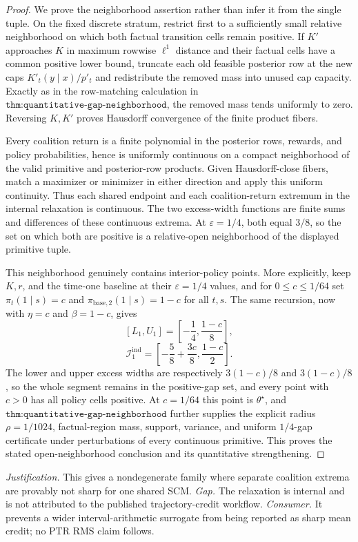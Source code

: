 \documentclass{article}
\begin{document}
\begin{proof}
We prove the neighborhood assertion rather than infer it from the single tuple.  On the fixed discrete stratum, restrict first to a sufficiently small relative neighborhood on which both factual transition cells remain positive.  If \(K'\) approaches \(K\) in maximum rowwise \(\ell^1\) distance and their factual cells have a common positive lower bound, truncate each old feasible posterior row at the new caps \(K'_t(y\mid x)/p'_t\) and redistribute the removed mass into unused cap capacity.  Exactly as in the row-matching calculation in \(\texttt{thm:quantitative-gap-neighborhood}\), the removed mass tends uniformly to zero.  Reversing \(K,K'\) proves Hausdorff convergence of the finite product fibers.

Every coalition return is a finite polynomial in the posterior rows, rewards, and policy probabilities, hence is uniformly continuous on a compact neighborhood of the valid primitive and posterior-row products.  Given Hausdorff-close fibers, match a maximizer or minimizer in either direction and apply this uniform continuity.  Thus each shared endpoint and each coalition-return extremum in the internal relaxation is continuous.  The two excess-width functions are finite sums and differences of these continuous extrema.  At \(\varepsilon=1/4\), both equal \(3/8\), so the set on which both are positive is a relative-open neighborhood of the displayed primitive tuple.

This neighborhood genuinely contains interior-policy points.  More explicitly, keep \(K,r\), and the time-one baseline at their \(\varepsilon=1/4\) values, and for \(0\le c\le1/64\) set \(\pi_t(1\mid s)=c\) and \(\pi_{\mathrm{base},2}(1\mid s)=1-c\) for all \(t,s\).  The same recursion, now with \(\eta=c\) and \(\beta=1-c\), gives
\[
 [L_1,U_1]=\left[-\frac14,\frac{1-c}{8}\right],
\]
\[
 \mathcal I_1^{\mathrm{ind}}
 =\left[-\frac58+\frac{3c}{8},\frac{1-c}{2}\right].
\]
The lower and upper excess widths are respectively \(3(1-c)/8\) and \(3(1-c)/8\), so the whole segment remains in the positive-gap set, and every point with \(c>0\) has all policy cells positive.  At \(c=1/64\) this point is \(\theta^\star\), and \(\texttt{thm:quantitative-gap-neighborhood}\) further supplies the explicit radius \(\rho=1/1024\), factual-region mass, support, variance, and uniform \(1/4\)-gap certificate under perturbations of every continuous primitive.  This proves the stated open-neighborhood conclusion and its quantitative strengthening.
\end{proof}
\par\smallskip\noindent \textit{Justification.} This gives a nondegenerate family where separate coalition extrema are provably not sharp for one shared SCM. \textit{Gap.} The relaxation is internal and is not attributed to the published trajectory-credit workflow. \textit{Consumer.} It prevents a wider interval-arithmetic surrogate from being reported as sharp mean credit; no PTR RMS claim follows.
\end{document}
